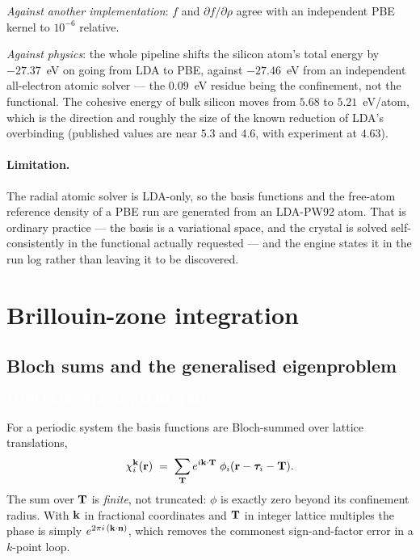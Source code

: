 \documentclass[11pt,a4paper]{article}
\newcommand{\badge}[2]{%
  \par\vspace{2pt}\noindent
  \colorbox{#1}{\textcolor{white}{\small\bfseries\,#2\,}}\par\vspace{4pt}}
\newcommand{\implemented}{\badge{okgreen}{IMPLEMENTED \& VALIDATED}}
\begin{document}
\emph{Against another implementation}: $f$ and $\partial f/\partial\rho$ agree
with an independent PBE kernel to $10^{-6}$ relative.

\emph{Against physics}: the whole pipeline shifts the silicon atom's total
energy by $-27.37$~eV on going from LDA to PBE, against $-27.46$~eV from an
independent all-electron atomic solver --- the $0.09$~eV residue being the
confinement, not the functional. The cohesive energy of bulk silicon moves
from $5.68$ to $5.21$~eV/atom, which is the direction and roughly the size of
the known reduction of LDA's overbinding (published values are near $5.3$ and
$4.6$, with experiment at $4.63$).

\paragraph{Limitation.} The radial atomic solver is LDA-only, so the basis
functions and the free-atom reference density of a PBE run are generated from
an LDA-PW92 atom. That is ordinary practice --- the basis is a variational
space, and the crystal is solved self-consistently in the functional actually
requested --- and the engine states it in the run log rather than leaving it
to be discovered.

\section{Brillouin-zone integration}
\label{sec:bz}

\subsection{Bloch sums and the generalised eigenproblem}
\implemented

For a periodic system the basis functions are Bloch-summed over lattice
translations,
\begin{equation}
  \chi_i^{\vb{k}}(\vb{r}) \;=\; \sum_{\vb{T}}
     e^{i\vb{k}\cdot\vb{T}}\; \phi_i(\vb{r} - \bm{\tau}_i - \vb{T}).
  \label{eq:bloch}
\end{equation}
The sum over $\vb{T}$ is \emph{finite}, not truncated: $\phi$ is exactly zero
beyond its confinement radius. With $\vb{k}$ in fractional coordinates and
$\vb{T}$ in integer lattice multiples the phase is simply
$e^{2\pi i\,(\vb{k}\cdot\vb{n})}$, which removes the commonest sign-and-factor
error in a $k$-point loop.
\end{document}
